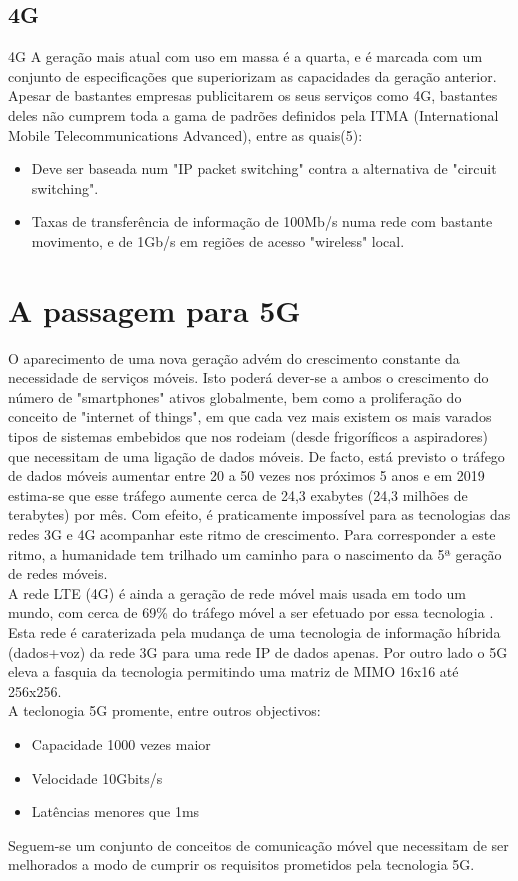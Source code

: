 \documentclass{llncs}
\begin{document}
\subsection{4G}
4G
\hspace*{1.5em}A geração mais atual com uso em massa é a quarta, e é marcada com um conjunto de especificações que superiorizam as capacidades da geração anterior. Apesar de bastantes empresas publicitarem os seus serviços como 4G, bastantes deles não cumprem toda a gama de padrões definidos pela ITMA (International Mobile Telecommunications Advanced), entre as quais(5):
\begin{itemize}
    \item Deve ser baseada num "IP packet switching" contra a alternativa de "circuit switching".
    \item Taxas de transferência de informação de 100Mb/s numa rede com bastante movimento, e de 1Gb/s em regiões de acesso "wireless" local.
\end{itemize}

\section{A passagem para 5G}
\hspace*{1.5em}O aparecimento de uma nova geração advém do crescimento constante da necessidade de serviços móveis. Isto poderá dever-se a ambos o crescimento do número de "smartphones" ativos globalmente, bem como a proliferação do conceito de "internet of things", em que cada vez mais existem os mais varados tipos de sistemas embebidos que nos rodeiam (desde frigoríficos a aspiradores) que necessitam de uma ligação de dados móveis. De facto, está previsto o tráfego de dados móveis aumentar entre 20 a 50 vezes nos próximos 5 anos e em 2019 estima-se que esse tráfego aumente cerca de 24,3 exabytes (24,3 milhões de terabytes) por mês. \cite{Fei} Com efeito, é praticamente impossível para as tecnologias das redes 3G e 4G acompanhar este ritmo de crescimento. Para corresponder a este ritmo, a humanidade tem trilhado um caminho para o nascimento da 5ª geração de redes móveis.
\\
\hspace*{1.5em}A rede LTE (4G) é ainda a geração de rede móvel mais usada em todo um mundo, com cerca de 69\% do tráfego móvel a ser efetuado por essa tecnologia \cite{cisco}. Esta rede é caraterizada pela mudança de uma tecnologia de informação híbrida (dados+voz) da rede 3G para uma rede IP de dados apenas.
Por outro lado o 5G eleva a fasquia da tecnologia permitindo uma matriz de MIMO 16x16 até 256x256. \\
A teclonogia 5G promente, entre outros objectivos:
\begin{itemize}
    \item Capacidade 1000 vezes maior
    \item Velocidade 10Gbits/s
    \item Latências menores que 1ms
\end{itemize}
Seguem-se um conjunto de conceitos de comunicação móvel que necessitam de ser melhorados a modo de cumprir os requisitos prometidos pela tecnologia 5G.
\end{document}
